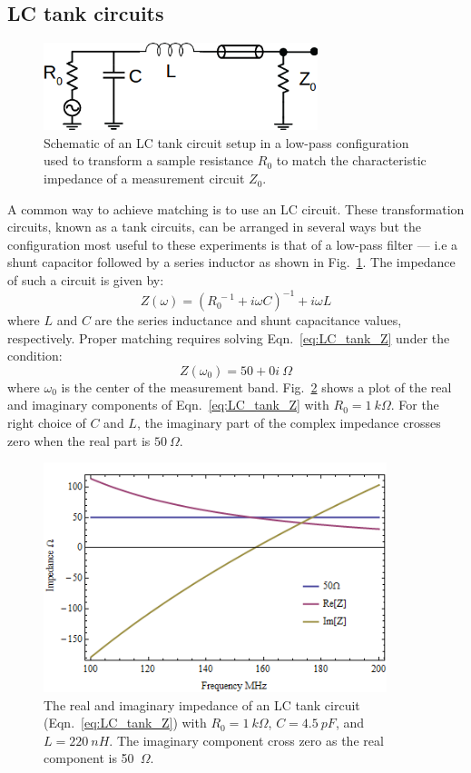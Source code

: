 \subsection{LC tank circuits}
\begin{figure}
\centering
\includegraphics[width=80mm]{figures/Johnson_noise_thermometry/schematic_matching.png}
\caption{Schematic of an LC tank circuit setup in a low-pass configuration used to transform a sample resistance $R_0$ to match the characteristic impedance of a measurement circuit $Z_0$.}
\label{fig:schematic_matching}
\end{figure}
A common way to achieve matching is to use an LC circuit. These transformation circuits, known as a tank circuits, can be arranged in several ways but the configuration most useful to these experiments is that of a low-pass filter --- i.e a shunt capacitor followed by a series inductor as shown in Fig.~\ref{fig:schematic_matching}. The impedance of such a circuit is given by:
\begin{equation}\label{eq:LC_tank_Z}
Z(\omega) = \left(R_0^{~-1}+i\omega C\right)^{-1}+i\omega L
\end{equation}
where $L$ and $C$ are the series inductance and shunt capacitance values, respectively. Proper matching requires solving Eqn.~\ref{eq:LC_tank_Z} under the condition:
\begin{equation}\label{eq:LC_tank_constraint}
Z(\omega_0) = 50+0i~\Omega 
\end{equation}
where $\omega_0$ is the center of the measurement band. Fig.~\ref{fig:LC_tank_Z} shows a plot of the real and imaginary components of Eqn.~\ref{eq:LC_tank_Z} with $R_0 = 1~k\Omega$. For the right choice of $C$ and $L$, the imaginary part of the complex impedance crosses zero when the real part is $50~\Omega$.
\begin{figure}
\centering
\includegraphics[width=100mm]{figures/Johnson_noise_thermometry/Impedance_matching2.png}
\caption{The real and imaginary impedance of an LC tank circuit (Eqn.~\ref{eq:LC_tank_Z}) with $R_0=1~k\Omega$, $C = 4.5~pF$, and $L = 220~nH$. The imaginary component cross zero as the real component is 50~$\Omega$.}
\label{fig:LC_tank_Z}
\end{figure}
